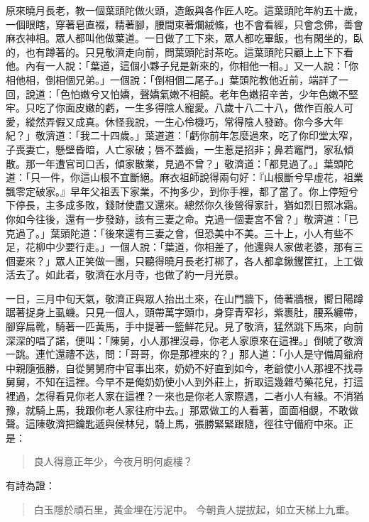 原來曉月長老，教一個葉頭陀做火頭，造飯與各作匠人吃。這葉頭陀年約五十歲，一個眼瞎，穿著皂直裰，精著腳，腰間束著爛絨絛，也不會看經，只會念佛，善會麻衣神相。眾人都叫他做葉道。一日做了工下來，眾人都吃畢飯，也有閑坐的，臥的，也有蹲著的。只見敬濟走向前，問葉頭陀討茶吃。這葉頭陀只顧上上下下看他。內有一人說：「葉道，這個小夥子兒是新來的，你相他一相。」又一人說：「你相他相，倒相個兄弟。」一個說：「倒相個二尾子。」葉頭陀教他近前，端詳了一回，說道：「色怕嫩兮又怕嬌，聲嬌氣嫩不相饒。老年色嫩招辛苦，少年色嫩不堅牢。只吃了你面皮嫩的虧，一生多得陰人寵愛。八歲十八二十八，做作百般人可愛，縱然弄假又成真。休怪我說，一生心伶機巧，常得陰人發跡。你今多大年紀？」敬濟道：「我二十四歲。」葉道道：「虧你前年怎麼過來，吃了你印堂太窄，子喪妻亡，懸壁昏暗，人亡家破；唇不蓋齒，一生惹是招非；鼻若竈門，家私傾散。那一年遭官司口舌，傾家散業，見過不曾？」敬濟道：「都見過了。」葉頭陀道：「只一件，你這山根不宜斷絕。麻衣祖師說得兩句好：『山根斷兮早虛花，祖業飄零定破家。』早年父祖丟下家業，不拘多少，到你手裡，都了當了。你上停短兮下停長，主多成多敗，錢財使盡又還來。總然你久後營得家計，猶如烈日照冰霜。你如今往後，還有一步發跡，該有三妻之命。克過一個妻宮不曾？」敬濟道：「已克過了。」葉頭陀道：「後來還有三妻之會，但恐美中不美。三十上，小人有些不足，花柳中少要行走。」一個人說：「葉道，你相差了，他還與人家做老婆，那有三個妻來？」眾人正笑做一團，只聽得曉月長老打梆了，各人都拿鍬钁筐扛，上工做活去了。如此者，敬濟在水月寺，也做了約一月光景。

一日，三月中旬天氣，敬濟正與眾人抬出土來，在山門牆下，倚著牆根，嚮日陽蹲踞著捉身上虱蟣。只見一個人，頭帶萬字頭巾，身穿青窄衫，紫裹肚，腰系纏帶，腳穿扁靴，騎著一匹黃馬，手中提著一籃鮮花兒。見了敬濟，猛然跳下馬來，向前深深的唱了諾，便叫：「陳舅，小人那裡沒尋，你老人家原來在這裡。」倒唬了敬濟一跳。連忙還禮不迭，問：「哥哥，你是那裡來的？」那人道：「小人是守備周爺府中親隨張勝，自從舅舅府中官事出來，奶奶不好直到如今，老爺使小人那裡不找尋舅舅，不知在這裡。今早不是俺奶奶使小人到外莊上，折取這幾雜芍藥花兒，打這裡過，怎得看見你老人家在這裡？一來也是你老人家際遇，二者小人有緣。不消猶豫，就騎上馬，我跟你老人家往府中去。」那眾做工的人看著，面面相覷，不敢做聲。這陳敬濟把鑰匙遞與侯林兒，騎上馬，張勝緊緊跟隨，徑往守備府中來。正是：
\begin{quote}
良人得意正年少，今夜月明何處樓？
\end{quote}
有詩為證：
\begin{quote}
白玉隱於頑石里，黃金埋在污泥中。
今朝貴人提拔起，如立天梯上九重。
\end{quote}
